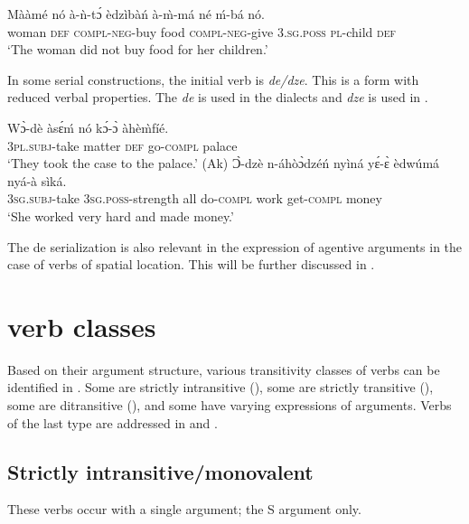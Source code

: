 \documentclass[output=paper]{langsci/langscibook}
\begin{document}
\ea
\label{ex:20.osam}
\gll Mààmé  nó  à-ǹ-tɔ́      èdzìbàń  à-\`{m}-má  né    ḿ-bá    nó. \\
     woman  \textsc{def}  \textsc{compl}-\textsc{neg}-buy  food    \textsc{compl}-\textsc{neg}-give \textsc{3.sg.poss}  \textsc{pl}-child  \textsc{def}\\
\glt `The woman did not buy food for her children.'
\z

In some serial constructions, the initial verb is \textit{de/dze}. This is a form with reduced verbal properties. The \textit{de} is used in the  dialects and \textit{dze} is used in . 

\ea\label{ex:21.osam}
\ea\label{ex:21a.osam}
\gll Wɔ̀-dè    àsɛ́ḿ  nó  kɔ́-ɔ̀    àhè\`{m}fíé.\\
       \textsc{3pl.subj}-take  matter  \textsc{def}  go-\textsc{compl}  palace\\
\glt   `They took the case to the palace.' (Ak)
\ex\label{ex:21b.osam}
\gll   Ɔ̀-dzè    n-áhòɔ̀dzéń    nyìná  yɛ́-ɛ̀      èdwúmá nyá-à    sìká.\\
       \textsc{3sg.subj}-take  \textsc{3sg.poss}-strength  all  do-\textsc{compl}  work get-\textsc{compl}  money\\
\glt   `She worked very hard and made money.'
\z 
\z 


The de serialization is also relevant in the expression of agentive arguments in the case of verbs of spatial location. This will be further discussed in .

\section{ verb classes}\label{§3:akan.osam}

Based on their argument structure, various transitivity classes of verbs can be identified in . Some are strictly intransitive (), some are strictly transitive (), some are ditransitive (), and some have varying expressions of arguments. Verbs of the last type are addressed in  and .

\subsection{Strictly intransitive/monovalent}\label{§3.1:strictly.osam}

These verbs occur with a single argument; the S argument only.
\end{document}
